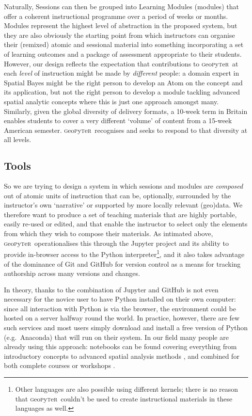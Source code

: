 \documentclass[letter, 11pt]{article}
\newcommand{\gp}{\textsc{g}eo\textsc{p}y\textsc{t}e\textsc{r}~\/}
\newcommand{\eg}{e.g.~\/}
\begin{document}
Naturally, Sessions can then be grouped into Learning Modules (modules) that offer a coherent instructional programme over a period of weeks or months. Modules represent the highest level of abstraction in the proposed system, but they are also obviously the starting point from which instructors can organise their (remixed) atomic and sessional material into something incorporating a set of learning outcomes and a package of assessment appropriate to their students. However, our design reflects the expectation that contributions to \gp at each \emph{level} of instruction might be made by \emph{different} people: a domain expert in Spatial Bayes might be the right person to develop an Atom on the concept and its application, but not the right person to develop a module tackling advanced spatial analytic concepts where this is just one approach amongst many. Similarly, given the global diversity of delivery formats, a 10-week term in Britain enables students to cover a very different `volume' of content from a 15-week American semester. \gp recognises and seeks to respond to that diversity at all levels.

\subsection{Tools}\label{tools}

So we are trying to design a system in which sessions and modules are \emph{composed} out of atomic units of instruction that can be, optionally, surrounded by the instructor's own `narrative' or supported by more locally relevant (geo)data. We therefore want to produce a set of teaching materials that are highly portable, easily re-used or edited, and that enable the instructor to select only the elements from which they wish to compose their materials. As intimated above, \gp operationalises this through the Jupyter project and its ability to provide in-browser access to the Python interpreter\footnote{Other languages are also possible using different kernels; there is no reason that \gp couldn't be used to create instructional materials in these languages as well.}, and it also takes advantage of the dominance of Git and GitHub for version control as a means for tracking authorship across many versions and changes.

In theory, thanks to the combination of Jupyter and GitHub is not even necessary for the novice user to have Python installed on their own computer: since all interaction with Python is via the browser, the environment could be hosted on a server halfway round the world. In practice, however, there are few such services and most users simply download and install a free version of Python (\eg Anaconda) that will run on their system. In our field many people are already using this approach: notebooks can be found covering everything from introductory concepts \citep{millington_reades_2017_code} to advanced spatial analysis methods \citep{darribas_gds15}, and combined for both complete courses or workshops \citep{rey_2016_narsc}.
\end{document}
